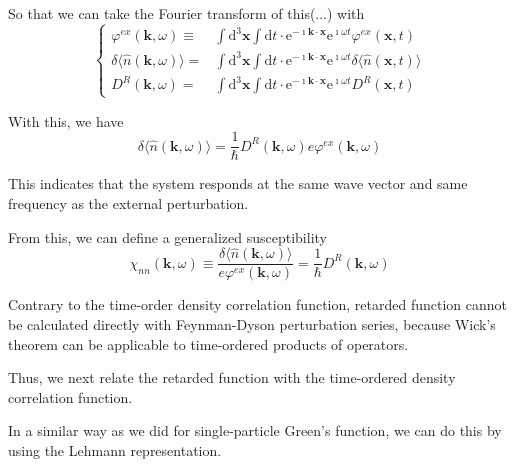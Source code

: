 So that we can take the Fourier transform of this(...) with
\begin{equation} \label{Eqs3.1.14}
\left\{ \begin{split}
\varphi^{ex}(\mathbf{k},\omega) \equiv& \int \mathrm{d}^3 \mathbf{x} \int \mathrm{d} t\cdot \mathrm{e}^{-\imath \mathbf{k} \cdot \mathbf{x}} \mathrm{e}^{\imath \omega t} \varphi^{ex}(\mathbf{x},t)\\
\delta \langle \hat{n}(\mathbf{k},\omega) \rangle =& \int \mathrm{d}^3 \mathbf{x} \int \mathrm{d} t\cdot \mathrm{e}^{-\imath \mathbf{k} \cdot \mathbf{x}} \mathrm{e}^{\imath \omega t} \delta \langle \hat{n}(\mathbf{x},t) \rangle\\
D^R(\mathbf{k},\omega) =& \int \mathrm{d}^3 \mathbf{x} \int \mathrm{d} t\cdot \mathrm{e}^{-\imath \mathbf{k} \cdot \mathbf{x}} \mathrm{e}^{\imath \omega t} D^R(\mathbf{x},t)
\end{split} \right.
\end{equation}

With this, we have
\begin{equation} \label{Eqs3.1.15}
\delta \langle \hat{n}(\mathbf{k},\omega) \rangle = \frac{1}{\hbar} D^R(\mathbf{k},\omega) e \varphi^{ex}(\mathbf{k},\omega)
\end{equation}

This indicates that the system responds at the same wave vector and same frequency as the external perturbation.

From this, we can define a generalized susceptibility
\begin{equation*} \label{Eqs3.1.15'} \tag{3.1.15'}
\chi_{nn}(\mathbf{k},\omega) \equiv \frac{\delta \langle \hat{n}(\mathbf{k},\omega) \rangle}{e \varphi^{ex}(\mathbf{k},\omega)} =\frac{1}{\hbar} D^R(\mathbf{k},\omega)
\end{equation*}

Contrary to the time-order density correlation function, retarded function cannot be calculated directly with Feynman-Dyson perturbation series, because Wick's theorem can be applicable to time-ordered products of operators.

Thus, we next relate the retarded function with the time-ordered density correlation function.

In a similar way as we did for single-particle Green's function, we can do this by using the Lehmann representation.


